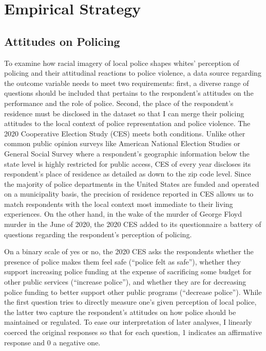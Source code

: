 \documentclass[
  12pt,
]{article}
\begin{document}
\hypertarget{empirical-strategy}{%
\section{Empirical Strategy}\label{empirical-strategy}}

\hypertarget{attitudes-on-policing}{%
\subsection{Attitudes on Policing}\label{attitudes-on-policing}}

To examine how racial imagery of local police shapes whites' perception
of policing and their attitudinal reactions to police violence, a data
source regarding the outcome variable needs to meet two requirements:
first, a diverse range of questions should be included that pertains to
the respondent's attitudes on the performance and the role of police.
Second, the place of the respondent's residence must be disclosed in the
dataset so that I can merge their policing attitudes to the local
context of police representation and police violence. The 2020
Cooperative Election Study (CES) meets both conditions. Unlike other
common public opinion surveys like American National Election Studies or
General Social Survey where a respondent's geographic information below
the state level is highly restricted for public access, CES of every
year discloses its respondent's place of residence as detailed as down
to the zip code level. Since the majority of police departments in the
United States are funded and operated on a municipality basis, the
precision of residence reported in CES allows us to match respondents
with the local context most immediate to their living experiences. On
the other hand, in the wake of the murder of George Floyd murder in the
June of 2020, the 2020 CES added to its questionnaire a battery of
questions regarding the respondent's perception of policing.

On a binary scale of yes or no, the 2020 CES asks the respondents
whether the presence of police makes them feel safe (``police felt as
safe''), whether they support increasing police funding at the expense
of sacrificing some budget for other public services (``increase
police''), and whether they are for decreasing police funding to better
support other public programs (``decrease police''). While the first
question tries to directly measure one's given perception of local
police, the latter two capture the respondent's attitudes on how police
should be maintained or regulated. To ease our interpretation of later
analyses, I linearly coerced the original responses so that for each
question, 1 indicates an affirmative response and 0 a negative one.
\end{document}
